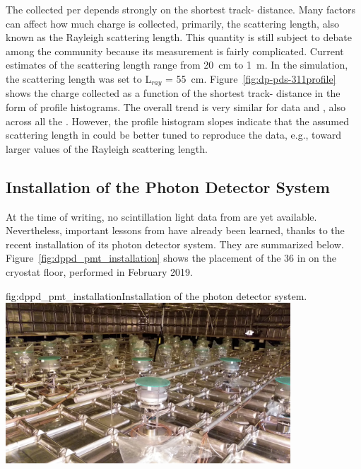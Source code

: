 
The  collected per  depends strongly on the shortest track- distance. Many factors can affect how much charge is collected, primarily, the scattering length, also known as the Rayleigh scattering length. This quantity is still subject to debate among the  community because its measurement is fairly complicated. Current estimates of the scattering length range from \SI{20}{\cm} to \SI{1}{\m}.
In the  simulation, the scattering length was set to L$_{ray}$ = \SI{55}{\cm}.
Figure~\ref{fig:dp-pds-311profile} shows the charge collected as a function of the shortest track- distance in the form of profile histograms. The overall trend is very similar for data and , also across all the . However, the profile histogram slopes indicate that the assumed scattering length in  could be better tuned to reproduce the data, e.g., toward larger values of the Rayleigh scattering length.


\subsection{Installation of the  Photon Detector System}

At the time of writing, no scintillation light data from  are yet available. Nevertheless, important lessons from  have already been learned, thanks to the recent installation of its photon detector system. They are summarized below. Figure~\ref{fig:dppd_pmt_installation} shows the placement of the \num{36}  in  on the cryostat floor, performed in February 2019.

\begin{dunefigure}{fig:dppd_pmt_installation}{Installation of the  photon detector system.}
\includegraphics[width=0.8\textwidth]{graphics/dppd_pmt_installation.jpg}
\end{dunefigure}

